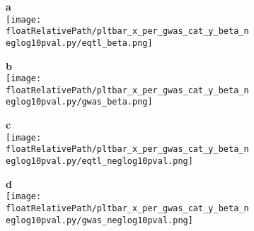 \begin{figure}[!tbp]

\begin{subfigure}[]{.50\textwidth}
\textbf{a}
\\
\texttt{[image: \\floatRelativePath/pltbar\_x\_per\_gwas\_cat\_y\_beta\_neglog10pval.py/eqtl\_beta.png]}
\end{subfigure}
%
\begin{subfigure}[]{.50\textwidth}
\textbf{b}
\\
\texttt{[image: \\floatRelativePath/pltbar\_x\_per\_gwas\_cat\_y\_beta\_neglog10pval.py/gwas\_beta.png]}
\end{subfigure}

\begin{subfigure}[]{.50\textwidth}
\textbf{c}
\\
\texttt{[image: \\floatRelativePath/pltbar\_x\_per\_gwas\_cat\_y\_beta\_neglog10pval.py/eqtl\_neglog10pval.png]}
\end{subfigure}
%
\begin{subfigure}[]{.50\textwidth}
\textbf{d}
\\
\texttt{[image: \\floatRelativePath/pltbar\_x\_per\_gwas\_cat\_y\_beta\_neglog10pval.py/gwas\_neglog10pval.png]}
\end{subfigure}

\end{figure}


%
%

